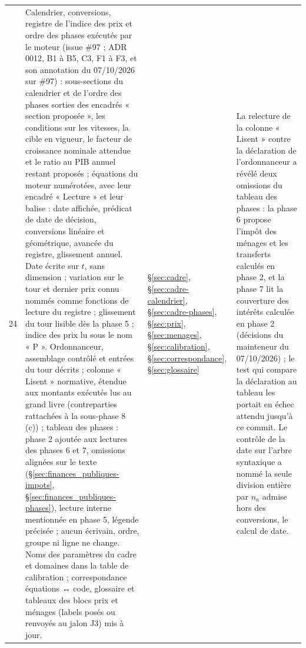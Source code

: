 \documentclass[11pt,a4paper]{article}
\begin{document}
\begin{center}
\begin{longtable}{p{0.5cm}>{\raggedright\arraybackslash}p{6.3cm}>{\raggedright\arraybackslash}p{2.1cm}>{\raggedright\arraybackslash}p{5.8cm}}
24 & Calendrier, conversions, registre de l'indice des prix et ordre des phases exécutés par le moteur (issue \#97 ; ADR 0012, B1 à B5, C3, F1 à F3, et son annotation du 07/10/2026 sur \#97) : sous-sections du calendrier et de l'ordre des phases sorties des encadrés « section proposée », les conditions sur les vitesses, la cible en vigueur, le facteur de croissance nominale attendue et le ratio au PIB annuel restant proposés ; équations du moteur numérotées, avec leur encadré « Lecture » et leur balise : date affichée, prédicat de date de décision, conversions linéaire et géométrique, avancée du registre, glissement annuel. Date écrite sur $t$, sans dimension ; variation sur le tour et dernier prix connu nommés comme fonctions de lecture du registre ; glissement du tour lisible dès la phase 5 ; indice des prix lu sous le nom « P ». Ordonnanceur, assemblage contrôlé et entrées du tour décrits ; colonne « Lisent » normative, étendue aux montants exécutés lus au grand livre (contreparties rattachées à la sous-phase 8\,(c)) ; tableau des phases : phase 2 ajoutée aux lectures des phases 6 et 7, omissions alignées sur le texte (\S\ref{sec:finances_publiques-impots}, \S\ref{sec:finances_publiques-phases}), lecture interne mentionnée en phase 5, légende précisée ; aucun écrivain, ordre, groupe ni ligne ne change. Noms des paramètres du cadre et domaines dans la table de calibration ; correspondance équations ↔ code, glossaire et tableaux des blocs prix et ménages (labels posés ou renvoyés au jalon J3) mis à jour. & \S\ref{sec:cadre}, \S\ref{sec:cadre-calendrier}, \S\ref{sec:cadre-phases}, \S\ref{sec:prix}, \S\ref{sec:menages}, \S\ref{sec:calibration}, \S\ref{sec:correspondance}, \S\ref{sec:glossaire} & La relecture de la colonne « Lisent » contre la déclaration de l'ordonnanceur a révélé deux omissions du tableau des phases : la phase 6 propose l'impôt des ménages et les transferts calculés en phase 2, et la phase 7 lit la couverture des intérêts calculée en phase 2 (décisions du mainteneur du 07/10/2026) ; le test qui compare la déclaration au tableau les portait en échec attendu jusqu'à ce commit. Le contrôle de la date sur l'arbre syntaxique a nommé la seule division entière par $n_a$ admise hors des conversions, le calcul de date.\\

\end{longtable}
\end{center}
\end{document}
